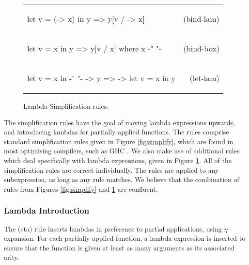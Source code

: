 \documentclass[preprint]{sigplanconf}
\newcommand{\simp}[2]{\begin{minipage}{6.4cm}#2\end{minipage} & (#1) \\}
\newenvironment{simplify}
    {\noindent
     \begin{flushright}
     \begin{tabular}{p{6.5cm}r}
    }
    {\end{tabular}
     \end{flushright}
    }
\begin{document}
\begin{figure}
\begin{simplify}

\simp{bind-lam}{
\ignore\begin{code}
let v = (\w -> x) in y
    => y[v / \w -> x]
\end{code}}

\simp{bind-box}{
\ignore\begin{code}
let v = x in y
    => y[v / x]
    where x {-" \text{ is a boxed lambda (see \S\ref{sec:inlining})} "-}
\end{code}}

\simp{let-lam}{
\ignore\begin{code}
let v = x in {-" "-} \w -> y
    => \w -> let v = x in y
\end{code}}

\end{simplify}
\caption{Lambda Simplification rules.}
\label{fig:lambda_simplify}
\end{figure}

The simplification rules have the goal of moving lambda expressions upwards, and introducing lambdas for partially applied functions. The rules comprise standard simplification rules given in Figure \ref{fig:simplify}, which are found in most optimising compilers, such as GHC \cite{spj:transformation}. We also make use of additional rules which deal specifically with lambda expressions, given in Figure \ref{fig:lambda_simplify}. All of the simplification rules are correct individually. The rules are applied to any subexpression, as long as any rule matches. We believe that the combination of rules from Figures \ref{fig:simplify} and \ref{fig:lambda_simplify} are confluent.

\subsubsection{Lambda Introduction}

The (eta) rule inserts lambdas in preference to partial applications, using $\eta$-expansion. For each partially applied function, a lambda expression is inserted to ensure that the function is given at least as many arguments as its associated arity.
\end{document}
